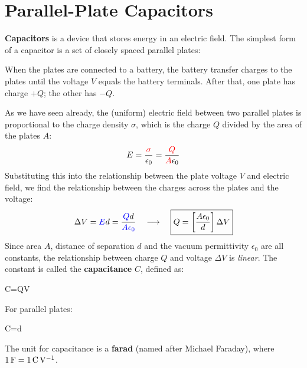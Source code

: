 \section{Parallel-Plate Capacitors}
\textbf{Capacitors} is a device that stores energy in an electric field. The
simplest form of a capacitor is a set of closely spaced parallel plates:
\begin{figure}[ht]
  \centering
\end{figure}
When the plates are connected to a battery, the battery transfer charges to
the plates until the voltage $V$ equals the battery terminals. After that,
one plate has charge $+Q$; the other has $-Q$.

As we have seen already, the (uniform) electric field between two parallel
plates is proportional to the charge density $\sigma$, which is the charge
$Q$ divided by the area of the plates $A$:
\begin{equation}
  E=\frac{\textcolor{red}{\sigma}}{\epsilon_0}=
  \frac{\textcolor{red}{Q}}{\textcolor{red}{A}\epsilon_0}
\end{equation}
Substituting this into the relationship between the plate voltage $V$ and
electric field, we find the relationship between the charges across the
plates and the voltage:
\begin{equation}
  \Delta V=\textcolor{blue} Ed=
  \frac{\textcolor{blue}{Q}d}{\textcolor{blue}{A\epsilon_0}}
  \quad\longrightarrow\quad
  \boxed{Q=\left[\frac{A\epsilon_0}d\right]\Delta V}
\end{equation}
Since area $A$, distance of separation $d$ and the vacuum permittivity
$\epsilon_0$ are all constants, the relationship between charge $Q$ and
voltage $\Delta V$ is \emph{linear}. The constant is called the
\textbf{capacitance} $C$, defined as:
\begin{important-equation}
  C=\frac Q{\Delta V}
\end{important-equation}
For parallel plates:
\begin{important-equation}
  C=d\quad{}
\end{important-equation}
The unit for capacitance is a \textbf{farad} (named after Michael Faraday),
where $\SI1\farad=\SI1{\coulomb\per\volt}$.




